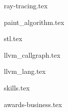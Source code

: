\documentclass[11pt]{article}
\begin{document}

{ray-tracing.tex}

{paint_algorithm.tex}

{stl.tex}


{llvm_callgraph.tex}

{llvm_lang.tex}


{skills.tex}


{awards-business.tex}
\end{document}
